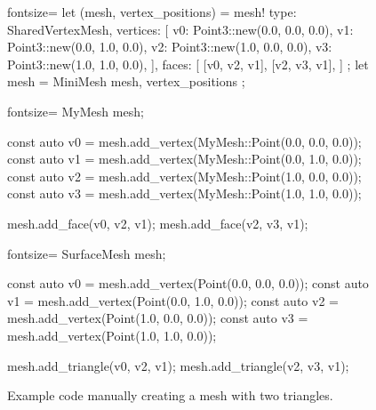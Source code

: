 \begin{figure}[p]
  \begin{minipage}{.04\textwidth}
  \end{minipage}
  \begin{minipage}{.9\textwidth}
    \begin{rustcode*}{fontsize=\footnotesize}
      let (mesh, vertex_positions) = mesh! {
          type: SharedVertexMesh,
          vertices: [
              v0: Point3::new(0.0, 0.0, 0.0),
              v1: Point3::new(0.0, 1.0, 0.0),
              v2: Point3::new(1.0, 0.0, 0.0),
              v3: Point3::new(1.0, 1.0, 0.0),
          ],
          faces: [
              [v0, v2, v1],
              [v2, v3, v1],
          ]
      };
      let mesh = MiniMesh { mesh, vertex_positions };
    \end{rustcode*}
  \end{minipage}\vspace{2mm}

  \begin{minipage}{.04\textwidth}
  \end{minipage}
  \begin{minipage}{.9\textwidth}
    \begin{cppcode*}{fontsize=\footnotesize}
      MyMesh mesh;

      const auto v0 = mesh.add_vertex(MyMesh::Point(0.0, 0.0, 0.0));
      const auto v1 = mesh.add_vertex(MyMesh::Point(0.0, 1.0, 0.0));
      const auto v2 = mesh.add_vertex(MyMesh::Point(1.0, 0.0, 0.0));
      const auto v3 = mesh.add_vertex(MyMesh::Point(1.0, 1.0, 0.0));

      mesh.add_face(v0, v2, v1);
      mesh.add_face(v2, v3, v1);
    \end{cppcode*}
  \end{minipage}\vspace{2mm}

  \begin{minipage}{.04\textwidth}
  \end{minipage}
  \begin{minipage}{.9\textwidth}
    \begin{cppcode*}{fontsize=\footnotesize}
      SurfaceMesh mesh;

      const auto v0 = mesh.add_vertex(Point(0.0, 0.0, 0.0));
      const auto v1 = mesh.add_vertex(Point(0.0, 1.0, 0.0));
      const auto v2 = mesh.add_vertex(Point(1.0, 0.0, 0.0));
      const auto v3 = mesh.add_vertex(Point(1.0, 1.0, 0.0));

      mesh.add_triangle(v0, v2, v1);
      mesh.add_triangle(v2, v3, v1);
    \end{cppcode*}
  \end{minipage}

  \caption{
    Example code manually creating a mesh with two triangles.
  }
\end{figure}

